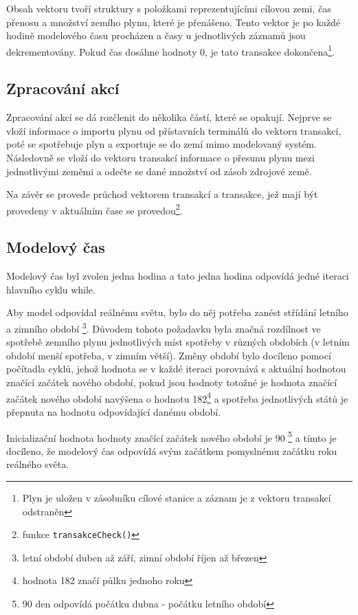\documentclass[a4paper,11pt]{article}
\begin{document}
Obsah vektoru tvoří struktury s položkami reprezentujícími cílovou zemi,
čas přenosu a množství zemího plynu, které je přenášeno.
Tento vektor je po každé hodině modelového času procházen a časy u jednotlivých záznamů jsou dekrementovány.
Pokud čas dosáhne hodnoty 0, je tato transakce dokončena\footnote{Plyn je uložen v zásobníku cílové stanice a záznam je z vektoru transakcí odstraněn}. 

\subsection{Zpracování akcí}

Zpracování akcí se dá rozčlenit do několika částí, které se opakují.
Nejprve se vloží informace o importu plynu od přístavních terminálů do vektoru transakcí,
poté se spotřebuje plyn a exportuje se do zemí mimo modelovaný systém.
Následovně se vloží do vektoru transakcí informace o přesunu plynu mezi jednotlivými zeměmi
a odečte se dané množství od zásob zdrojové země.

Na závěr se provede průchod vektorem transakcí a transakce,
jež mají být provedeny v aktuálním čase se provedou\footnote{funkce \texttt{transakceCheck()}}. 

\subsection{Modelový čas}

Modelový čas byl zvolen jedna hodina a tato jedna hodina odpovídá jedné iteraci hlavního cyklu while.

Aby model odpovídal reálnému světu, bylo do něj potřeba zanést střídání letního a zimního období
\footnote{letní období duben až září, zimní období říjen až březen}.
Důvodem tohoto požadavku byla značná rozdílnost ve spotřebě zemního plynu jednotlivých míst spotřeby
v různých obdobích (v letním období menší spotřeba, v zimním větší).
Změny období bylo docíleno pomocí počítadla cyklů, jehož hodnota se v každé iteraci porovnává 
s aktuální hodnotou značící začátek nového období, pokud jsou hodnoty totožné 
je hodnota značící začátek nového období navýšena o hodnotu 182\footnote{hodnota 182 značí půlku jednoho roku}
a spotřeba jednotlivých států je přepnuta na hodnotu odpovídající danému období.

Inicializační hodnota hodnoty značící začátek nového období je 90 \footnote{90 den odpovídá počátku dubna - počátku letního období}
a tímto je docíleno, že modelový čas odpovídá svým začátkem pomyslnému začátku roku reálného světa.
\end{document}
